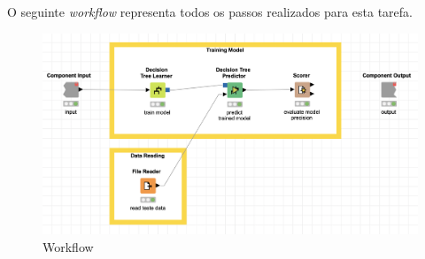 \clearpage

O seguinte \textit{workflow} representa todos os passos realizados para esta tarefa.

\begin{figure}[H]
    \centering
    \includegraphics[scale=0.4]{Images/T3.png}
    \caption{Workflow}
\end{figure}